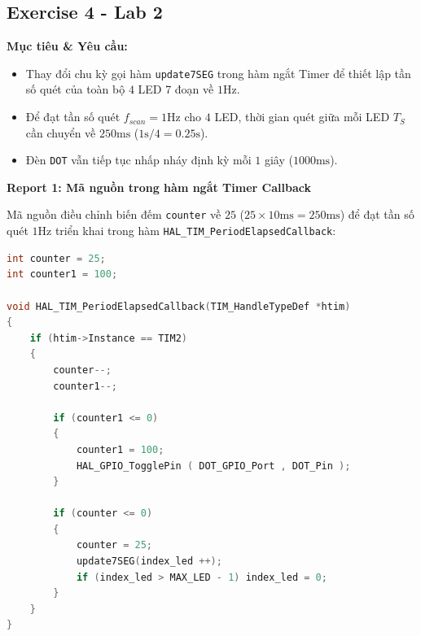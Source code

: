 \subsection{Exercise 4 - Lab 2}

\textbf{Mục tiêu \& Yêu cầu:}
\begin{itemize}
    \item Thay đổi chu kỳ gọi hàm \texttt{update7SEG} trong hàm ngắt Timer để thiết lập tần số quét của toàn bộ $4$ LED 7 đoạn về $1\text{Hz}$.
    \item Để đạt tần số quét $f_{scan} = 1\text{Hz}$ cho $4$ LED, thời gian quét giữa mỗi LED $T_S$ cần chuyển về $250\text{ms}$ ($1\text{s} / 4 = 0.25\text{s}$).
    \item Đèn \texttt{DOT} vẫn tiếp tục nhấp nháy định kỳ mỗi $1$ giây ($1000\text{ms}$).
\end{itemize}

\vspace{0.3cm}

\textbf{Report 1: Mã nguồn trong hàm ngắt Timer Callback}

Mã nguồn điều chỉnh biến đếm \texttt{counter} về $25$ ($25 \times 10\text{ms} = 250\text{ms}$) để đạt tần số quét $1\text{Hz}$ triển khai trong hàm \texttt{HAL\_TIM\_PeriodElapsedCallback}:

\begin{lstlisting}[language=C, caption={Cấu hình quét 4 LED 7 đoạn tần số 1Hz trong hàm ngắt Timer}, label={lst:lab2_ex4_callback}]
int counter = 25;
int counter1 = 100;

void HAL_TIM_PeriodElapsedCallback(TIM_HandleTypeDef *htim)
{
    if (htim->Instance == TIM2)
    {
        counter--;
        counter1--;

        if (counter1 <= 0)
        {
        	counter1 = 100;
        	HAL_GPIO_TogglePin ( DOT_GPIO_Port , DOT_Pin );
        }

        if (counter <= 0)
        {
            counter = 25;
            update7SEG(index_led ++);
            if (index_led > MAX_LED - 1) index_led = 0;
        }
    }
}
\end{lstlisting}